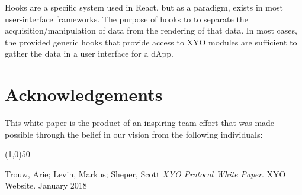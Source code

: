 \documentclass{article}
\begin{document}
Hooks are a specific system used in React, but as a paradigm, exists in most user-interface frameworks.  The purpose of hooks to to separate the acquisition/manipulation of data from the rendering of that data.  In most cases, the provided generic hooks that provide access to XYO modules are sufficient to gather the data in a user interface for a dApp.


\section {Acknowledgements}
This white paper is the product of an inspiring team effort that was made possible through the belief in our vision from the following individuals: 

\begin{center}
    \line(1,0){50}
\end{center}



\begin{thebibliography}{9}

    Trouw, Arie; Levin, Markus; Sheper, Scott
    \textit{XYO Protocol White Paper}.
    XYO Website. January 2018

\end{thebibliography}

\clearpage

\printglossaries

\end{document}
